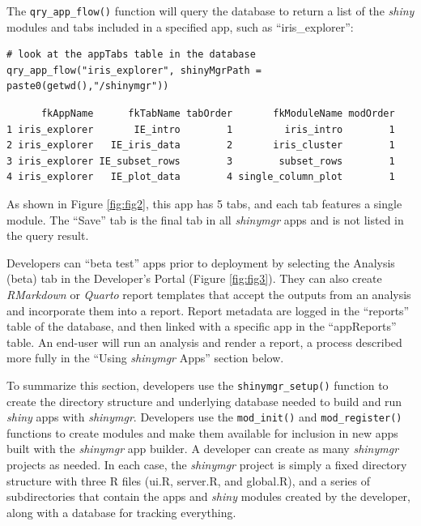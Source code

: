The \texttt{qry\_app\_flow()} function will query the database to return a list of the \emph{shiny} modules and tabs included in a specified app, such as ``iris\_explorer'':

\begin{verbatim}
# look at the appTabs table in the database
qry_app_flow("iris_explorer", shinyMgrPath = paste0(getwd(),"/shinymgr"))
\end{verbatim}

\begin{verbatim}
      fkAppName      fkTabName tabOrder       fkModuleName modOrder
1 iris_explorer       IE_intro        1         iris_intro        1
2 iris_explorer   IE_iris_data        2       iris_cluster        1
3 iris_explorer IE_subset_rows        3        subset_rows        1
4 iris_explorer   IE_plot_data        4 single_column_plot        1
\end{verbatim}

As shown in Figure \ref{fig:fig2}, this app has 5 tabs, and each tab features a single module. The ``Save'' tab is the final tab in all \emph{shinymgr} apps and is not listed in the query result.

Developers can ``beta test'' apps prior to deployment by selecting the Analysis (beta) tab in the Developer's Portal (Figure \ref{fig:fig3}). They can also create \emph{RMarkdown} or \emph{Quarto} report templates that accept the outputs from an analysis and incorporate them into a report. Report metadata are logged in the ``reports'' table of the database, and then linked with a specific app in the ``appReports'' table. An end-user will run an analysis and render a report, a process described more fully in the ``Using \emph{shinymgr} Apps'' section below.

To summarize this section, developers use the \texttt{shinymgr\_setup()} function to create the directory structure and underlying database needed to build and run \emph{shiny} apps with \emph{shinymgr}. Developers use the \texttt{mod\_init()} and \texttt{mod\_register()} functions to create modules and make them available for inclusion in new apps built with the \emph{shinymgr} app builder. A developer can create as many \emph{shinymgr} projects as needed. In each case, the \emph{shinymgr} project is simply a fixed directory structure with three R files (ui.R, server.R, and global.R), and a series of subdirectories that contain the apps and \emph{shiny} modules created by the developer, along with a database for tracking everything.

